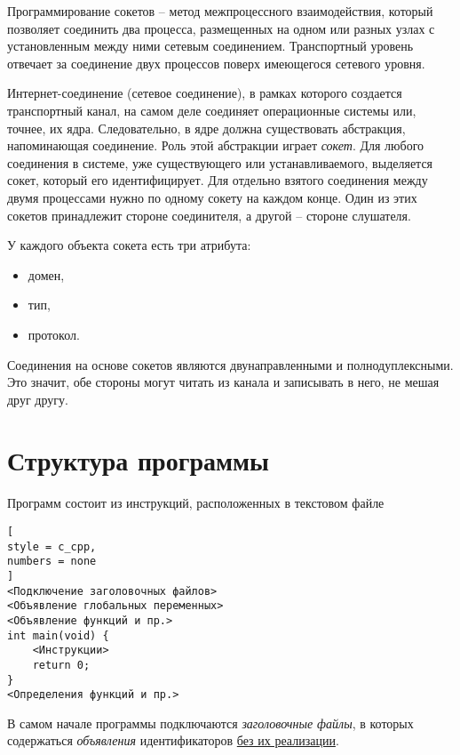 \documentclass[%
	11pt,
	a4paper,
	utf8,
		]{article}
\begin{document}
Программирование сокетов -- метод межпроцессного взаимодействия, который позволяет соединить два процесса, размещенных на одном или разных узлах с установленным между ними сетевым соединением. Транспортный уровень отвечает за соединение двух процессов поверх имеющегося сетевого уровня.

Интернет-соединение (сетевое соединение), в рамках которого создается транспортный канал, на самом деле соединяет операционные системы или, точнее, их ядра. Следовательно, в ядре должна существовать абстракция, напоминающая соединение. Роль этой абстракции играет \emph{сокет}. Для любого соединения в системе, уже существующего или устанавливаемого, выделяется сокет, который его идентифицирует. Для отдельно взятого соединения между двумя процессами нужно по одному сокету на каждом конце. Один из этих сокетов принадлежит стороне соединителя, а другой -- стороне слушателя.

У каждого объекта сокета есть три атрибута:
\begin{itemize}
	\item домен,
	
	\item тип,
	
	\item протокол.
\end{itemize}

Соединения на основе сокетов являются двунаправленными и полнодуплексными. Это значит, обе стороны могут читать из канала и записывать в него, не мешая друг другу.











\section{Структура программы}

Программ состоит из инструкций, расположенных в текстовом файле
\begin{lstlisting}[
style = c_cpp,
numbers = none
]
<Подключение заголовочных файлов>
<Объявление глобальных переменных>
<Объявление функций и пр.>
int main(void) {
    <Инструкции>
    return 0;
}
<Определения функций и пр.>
\end{lstlisting}

В самом начале программы подключаются \emph{заголовочные файлы}, в которых содержаться \emph{объявления} идентификаторов \underline{без их реализации}.
\end{document}
